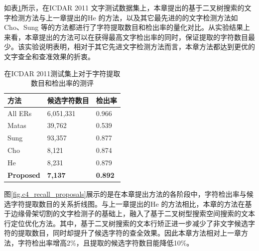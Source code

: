        如表\ref{tab.c4_icdar11}所示，在ICDAR 2011 文字测试数据集上，本章提出的基于二叉树搜索的文字检测方法与上一章提出的He\cite{He2017scene} 的方法，以及其它最先进的的文字检测方法如Cho\cite{Cho2016Canny}、Sung\cite{Sung2015Scene} 等的方法都进行了字符提取数目和检出率的量化对比。从实验结果上来看，本章提出的方法可以在获得最高文字检出率的同时，保证提取的字符数目最少。该实验说明表明，相对于其它先进文字检测方法而言，本章方法都达到更优的文字查全和查准效果的折衷。

        \begin{table}[!h]
        \centering
        \caption{在ICDAR 2011测试集上对于字符提取数目和检出率的测评}
        \begin{tabular}{p{}|p{} p{}}
        \hline
        方法 & 候选字符数目 & 检出率 \\
        \hline
        All ERs & 6,051,331 & 0.966 \\
        Matas\cite{Matas2004Robust} & 39,762 & 0.539 \\
        Sung\cite{Sung2015Scene} & 93,357 & 0.877  \\
        Cho\cite{Cho2016Canny} & 8,121 & 0.874 \\
        He\cite{He2017scene} & 8,231 & 0.879 \\
        \hline
        \textbf{Proposed} & \textbf{7,137} & \textbf{0.892} \\
        \hline
        \end{tabular}
        \label{tab.c4_icdar11}
        \end{table}

        图\ref{fig.c4_recall_proposals}展示的是在本章提出方法的各阶段中，字符检出率与候选字符提取数目的关系折线图。与上一章提出的He\cite{He2017scene} 的方法相比，本章的方法在基于边缘骨架切割的文字检测子的基础上，融入了基于二叉树型搜索空间搜索的文本行定位优化方法。其中，基于二叉树搜索的文本行矫正进一步减少了非文字候选字符的提取数目，同时却提升了候选字符的查全效果。因此本章方法相对上一章方法，字符检出率增高2\%，且提取的候选字符数目能降低10\%。

